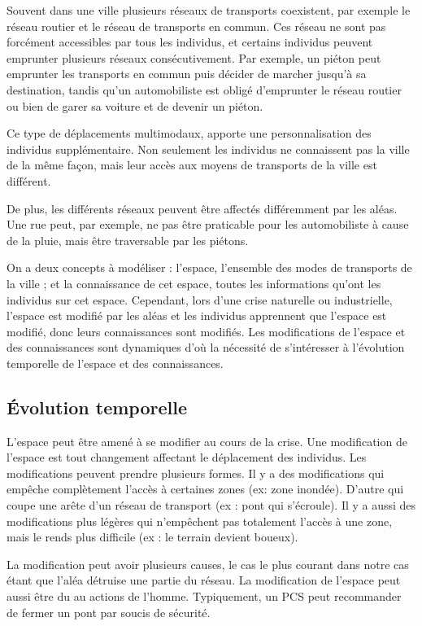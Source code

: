 \documentclass[a4paper]{article}
\newcommand{\comment}[1]{}
\begin{document}
Souvent dans une ville plusieurs réseaux de transports coexistent, par exemple
le réseau routier et le réseau de transports en commun. Ces réseau ne sont pas
forcément accessibles par tous les individus, et certains individus peuvent
emprunter plusieurs réseaux consécutivement. Par exemple, un piéton peut
emprunter les transports en commun puis décider de marcher jusqu'à sa
destination, tandis qu'un automobiliste est obligé d'emprunter le réseau routier
ou bien de garer sa voiture et de devenir un piéton.

Ce type de déplacements multimodaux, \comment{je me sens pas à l'aise avec ce
mot} apporte une personnalisation des individus supplémentaire. Non seulement
les individus ne connaissent pas la ville de la même façon, mais leur accès
aux moyens de transports de la ville est différent.

De plus, les différents réseaux peuvent être affectés différemment par les
aléas. Une rue peut, par exemple, ne pas être praticable pour les automobiliste
à cause de la pluie, mais être traversable par les piétons.

On a deux concepts à modéliser : l'espace, l'ensemble des modes de transports de
la ville ; et la connaissance de cet espace, toutes les informations qu'ont les
individus sur cet espace. Cependant, lors d'une crise naturelle ou industrielle,
l'espace est modifié par les aléas et les individus apprennent que l'espace est
modifié, donc leurs connaissances sont modifiés. Les modifications de l'espace
et des connaissances sont dynamiques \comment{HMMMM} d'où la nécessité de
s'intéresser à l'évolution temporelle de l'espace et des connaissances.

\subsection{Évolution temporelle}

L'espace peut être amené à se modifier au cours de la crise. Une modification de
l'espace est tout changement affectant le déplacement des individus.  Les
modifications peuvent prendre plusieurs formes. Il y a des modifications qui
empêche complètement l'accès à certaines zones (ex: zone inondée). D'autre qui
coupe une arête d'un réseau de transport (ex : pont qui s'écroule). Il y a aussi
des modifications plus légères qui n'empêchent pas totalement l'accès à une
zone, mais le rends plus difficile (ex : le terrain devient boueux).

La modification peut avoir plusieurs causes, le cas le plus courant dans notre
cas étant que l'aléa \comment{il faut que j'arrête d'utiliser "aléa" pour parler
de la source des dégâts, c'est pas le bon mot} détruise une partie du réseau. La
modification de l'espace peut aussi être du au actions de l'homme. Typiquement,
un PCS peut recommander de fermer un pont par soucis de sécurité.
\end{document}
